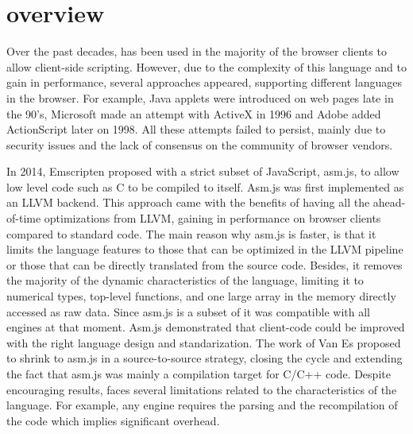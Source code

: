 \section{\wasm overview}
\label{sota:wasm}

\newcommand{\lstnumberautorefname}{Line}
\newcommand{\lineref}[1]{\autoref{#1}}




Over the past decades,  has been used in the majority of the browser clients to allow client-side scripting. However, due to the complexity of this language and to gain in performance, several approaches appeared, supporting different languages in the browser.  For example, Java applets were introduced on web pages late in the 90's, Microsoft made an attempt with ActiveX in 1996  and Adobe added ActionScript later on 1998. All these attempts failed to persist, mainly due to security issues and the lack of consensus on the community of browser vendors. 

In 2014, Emscripten proposed with a strict subset of JavaScript, asm.js, to allow low level code such as C to be compiled to itself. Asm.js was first implemented as an LLVM backend. This approach came with the benefits of having all the ahead-of-time optimizations from LLVM, gaining in performance on browser clients \cite{asmjs} compared to standard code. The main reason why asm.js is faster, is that it limits the language features to those that can be optimized in the LLVM pipeline or those that can be directly translated from the source code. Besides, it removes the majority of the dynamic characteristics of the language, limiting it to numerical types, top-level functions, and one large array in the memory directly accessed as raw data. Since asm.js is a subset of it was compatible with all engines at that moment. Asm.js demonstrated that client-code could be improved with the right language design and standarization.
The work of Van Es \etal \cite{EsAsm.js} proposed to shrink to asm.js in a source-to-source strategy, closing the cycle and extending the fact that asm.js was mainly a compilation target for C/C++ code. Despite encouraging results, faces several limitations related to the characteristics of the language. For example, any engine requires the parsing and the recompilation of the code which implies significant overhead.

